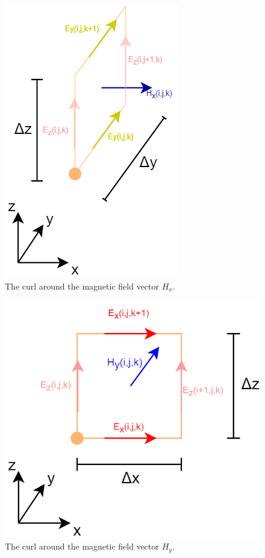 \begin{figure}[h!]
	\centering
	\includegraphics[scale=0.6]{Figures/fdtd3dHxCurl}
	\decoRule
	\caption[3D $H_x$ vector curl]{The curl around the magnetic field vector $H_x$.}
	\label{fig:fdtd3dHxCurl}
\end{figure}


\begin{figure}[h!]
	\centering
	\includegraphics[scale=0.5]{Figures/fdtd3dHyCurl}
	\decoRule
	\caption[3D $H_y$ vector curl]{The curl around the magnetic field vector $H_y$.}
	\label{fig:fdtd3dHyCurl}
\end{figure}

